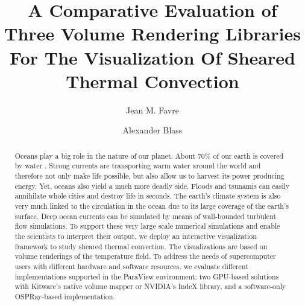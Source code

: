 \documentclass[5p,times]{elsarticle}
\begin{document}
\begin{frontmatter}



\title{A Comparative Evaluation of Three Volume Rendering Libraries For The Visualization Of Sheared Thermal Convection}


\author[CSCS]{Jean M. Favre}


\author[Twente]{Alexander Blass}

\address[CSCS]{Swiss National Supercomputing Center (CSCS), Via Trevano 131, CH-6900 Lugano, Switzerland}
\address[Twente]{Physics of Fluids Group, Max Planck Center for Complex Fluid Dynamics,
J. M. Burgers Center for Fluid Dynamics and MESA+ Research Institute,
Department of Science and Technology,
University of Twente, P.O. Box 217, 7500 AE Enschede, The Netherlands}



\begin{abstract}
Oceans play a big role in the nature of our planet. About $ 70 \% $ of our earth
is covered by water \cite{int14}. Strong currents are transporting warm water around the world
and therefore not only make life possible, but also allow us to harvest its
power producing energy. Yet, oceans also
yield a much more deadly side. Floods and tsunamis can easily annihilate whole
cities and destroy life in seconds. The earth's climate system is also very much
linked to the circulation in the ocean due to its large coverage of the earth's surface.
Deep ocean currents can be simulated by means of wall-bounded turbulent flow simulations.
To support these very large scale numerical simulations and enable the scientists to interpret their output,
we deploy an interactive visualization framework to study sheared thermal convection.
The visualizations are based on volume renderings of the temperature field.
To address the needs of supercomputer users with different hardware and software resources,
we evaluate different implementations supported in the ParaView \cite{Ahrens2005} environment:
two GPU-based solutions with Kitware's native volume mapper or NVIDIA's IndeX library,
and a software-only OSPRay-based implementation.


\end{abstract}
\end{frontmatter}
\end{document}
